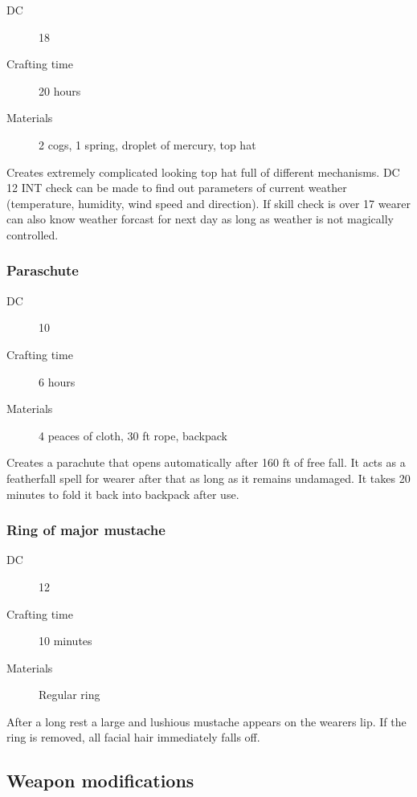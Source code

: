 \begin{description}
\item [DC] 18 \nature
\item [Crafting time] 20 hours
\item [Materials] 2 cogs, 1 spring, droplet of mercury, top hat
\end{description}

Creates extremely complicated looking top hat full of different mechanisms. DC 12 INT check can be made to find out parameters of current weather (temperature, humidity, wind speed and direction). If skill check is over 17 wearer can also know weather forcast for next day as long as weather is not magically controlled.

\subsubsection{Paraschute}

\begin{description}
\item [DC] 10 \sleightofhands
\item [Crafting time] 6 hours
\item [Materials] 4 peaces of cloth, 30 ft rope, backpack
\end{description}

Creates a parachute that opens automatically after 160 ft of free fall. It acts as a featherfall spell for wearer after that as long as it remains undamaged. It takes 20 minutes to fold it back into backpack after use.

\subsubsection{Ring of major mustache}

\begin{description}
\item [DC] 12 \arcana
\item [Crafting time] 10 minutes
\item [Materials] Regular ring
\end{description}

After a long rest a large and lushious mustache appears on the wearers lip. If the ring is removed, all facial hair immediately falls off.

\subsection{Weapon modifications}

